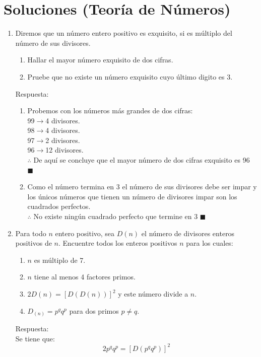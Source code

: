 \documentclass{book}
\begin{document}
	\section{Soluciones (Teoría de Números)} 
		\begin{enumerate}
			\item Diremos que un número entero positivo es exquisito, si es múltiplo del número de sus divisores. 
				
			\begin{enumerate}
				\item  Hallar el mayor número exquisito de dos cifras.  
				\item Pruebe que no existe un número exquisito cuyo último digito es 3. 
			\end{enumerate}
			Respuesta:
			\begin{enumerate}
					\item Probemos con los números más grandes de dos cifras:\\
99$\rightarrow$4 divisores.\\
98$\rightarrow$4 divisores.\\
97$\rightarrow$2 divisores.\\
96$\rightarrow$12 divisores.\\
$ \therefore$ De aquí se concluye que el mayor número de dos cifras exquisito es 96 $\blacksquare$
					\item  Como el número termina en 3 el  número de sus divisores debe ser impar y los únicos números que tienen un número de divisores impar son los cuadrados perfectos. \\
  $\therefore$ No existe ningún cuadrado perfecto que termine en 3 $\blacksquare$ \\   
				\end{enumerate}
			\item  Para todo $n$ entero positivo, sea $D(n)$ el número de divisores enteros positivos de $n$. Encuentre todos los enteros positivos $n$ para los cuales: 
			\begin{enumerate}
				\item $n$ es múltiplo de 7.
				\item $n$ tiene al menos 4 factores primos. 
				\item $2D(n)={[D(D(n))]}^2$ y este número divide a $n$.
				\item  $D_{(n)}= p^qq^p$ para dos primos $ p \neq q  $.
			\end{enumerate}
			Respuesta:\\
			 Se tiene que: 
$$2p^qq^p = {[D(p^qq^p)]}^2$$

\end{enumerate}
\end{document}
